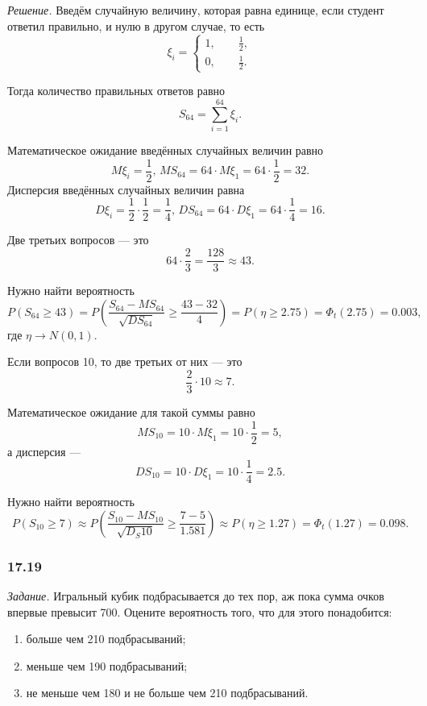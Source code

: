 \textit{Решение.}
Введём случайную величину, которая равна единице, если студент ответил правильно,
и нулю в другом случае, то есть
$$ \xi_i =
  \begin{cases}
    1, \qquad \frac{1}{2}, \\
    0, \qquad \frac{1}{2}.
  \end{cases}$$

Тогда количество правильных ответов равно
$$S_{64} =
  \sum \limits_{i = 1}^{64} \xi_i.$$

Математическое ожидание введённых случайных величин равно
$$M \xi_i = \frac{1}{2}, \,
  MS_{64} = 64 \cdot M \xi_1 = 64 \cdot \frac{1}{2} = 32.$$
Дисперсия введённых случайных величин равна
$$D \xi_i = \frac{1}{2} \cdot \frac{1}{2} = \frac{1}{4}, \,
  DS_{64} = 64 \cdot D \xi_1 = 64 \cdot \frac{1}{4} = 16.$$

Две третьих вопросов --- это
$$64 \cdot \frac{2}{3} =
  \frac{128}{3} \approx
  43.$$

Нужно найти вероятность
$$P \left( S_{64} \geq 43 \right) =
  P \left( \frac{S_{64} - MS_{64}}{ \sqrt{DS_{64}}} \geq \frac{43 - 32}{4} \right) =
  P \left( \eta \geq 2.75 \right) =
  \Phi_t \left( 2.75 \right) =
  0.003,$$
где $ \eta \to N \left( 0, 1 \right) $.

Если вопросов 10, то две третьих от них --- это
$$ \frac{2}{3} \cdot 10 \approx
  7.$$

Математическое ожидание для такой суммы равно
$$MS_{10} =
  10 \cdot M \xi_1 =
  10 \cdot \frac{1}{2} =
  5,$$
а дисперсия ---
$$DS_{10} =
  10 \cdot D \xi_1 =
  10 \cdot \frac{1}{4} =
  2.5.$$

Нужно найти вероятность
$$P \left( S_{10} \geq 7 \right) \approx
  P \left( \frac{S_{10} - MS_{10}}{ \sqrt{D_S{10}}} \geq \frac{7 - 5}{1.581} \right) \approx
  P \left( \eta \geq 1.27 \right) =
  \Phi_t \left( 1.27 \right) =
  0.098.$$

\subsubsection*{17.19}

\textit{Задание.}
Игральный кубик подбрасывается до тех пор, аж пока сумма очков впервые превысит 700.
Оцените вероятность того, что для этого понадобится:
\begin{enumerate}[label=\alph*)]
  \item больше чем 210 подбрасываний;
  \item меньше чем 190 подбрасываний;
  \item не меньше чем 180 и не больше чем 210 подбрасываний.
\end{enumerate}

